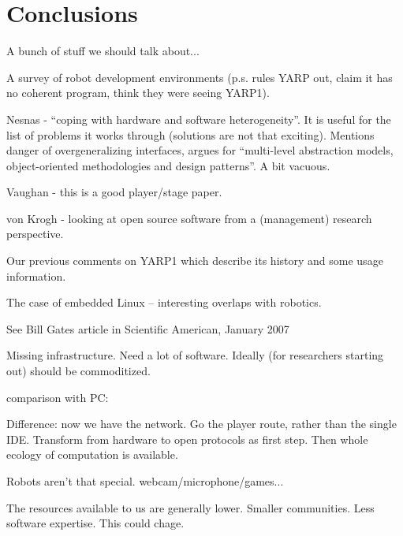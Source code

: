 
\section{Conclusions}

A bunch of stuff we should talk about...

A survey of robot development environments
\cite{kramer2007development} (p.s. rules YARP out, claim it has
no coherent program, think they were seeing YARP1).



Nesnas \cite{nesnas2006claraty} - ``coping with hardware and software 
heterogeneity''.  It is useful for the list of problems it
works through (solutions are not that exciting).
%
Mentions danger of overgeneralizing interfaces, argues for 
``multi-level abstraction models, object-oriented methodologies
and design patterns''.  A bit vacuous.

Vaughan \cite{vaughan2006reusable} - this is a good player/stage
paper.

von Krogh \cite{vonkrogh2006promise} - looking at open source
software from a (management) research perspective.

Our previous comments on YARP1 \cite{metta2006yarp} which
describe its history and some usage information.

The case of embedded Linux \cite{henkel2006selective} --
interesting overlaps with robotics.

See Bill Gates article in Scientific American, January 2007

Missing infrastructure.
Need a lot of software.
Ideally (for researchers starting out) should be commoditized.


comparison with PC:

Difference: now we have the network.  Go the player route, rather than
the single IDE.  Transform from hardware to open protocols as first
step.  Then whole ecology of computation is available.

Robots aren't that special.  webcam/microphone/games...

The resources available to us are generally lower.  Smaller communities.
Less software expertise.  This could chage.







